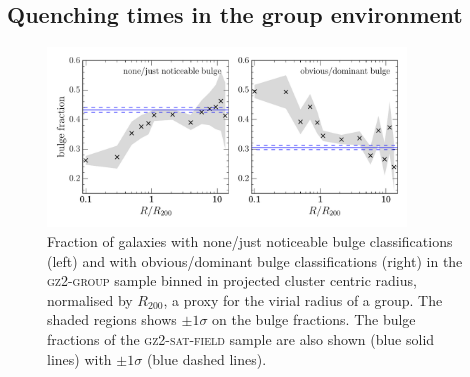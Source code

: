 \documentclass[useAMS,usenatbib]{mn2e}
\begin{document}

\subsection{Quenching times in the group environment}

\begin{figure}
\includegraphics[width=0.85\textwidth]{min_max_bulge_fraction_trend_with_log_radius_sat_field_cand.pdf}
\caption{Fraction of galaxies with none/just noticeable bulge classifications (left) and with obvious/dominant bulge classifications (right) in the \textsc{gz2-group} sample binned in projected cluster centric radius, normalised by $R_{200}$, a proxy for the virial radius of a group. The shaded regions shows $\pm1\sigma$ on the bulge fractions. The bulge fractions of the \textsc{gz2-sat-field} sample are also shown (blue solid lines) with $\pm1\sigma$ (blue dashed lines).}
\label{fig:bulgeradius}
\end{figure}
\end{document}
